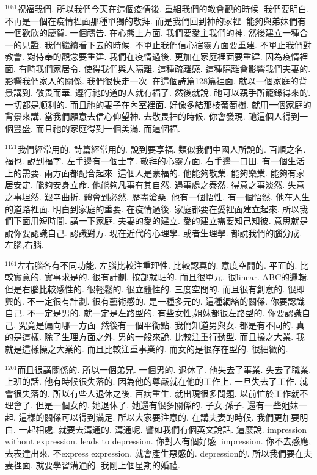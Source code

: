 \documentclass{book}
\begin{document}
$^{1081}$祝福我們.
所以我們今天在這個疫情後.
重組我們的教會觀的時候.
我們要明白.
不再是一個在疫情裡面那種單獨的敬拜.
而是我們回到神的家裡.
能夠與弟妹們有一個歡欣的慶賀.
一個禱告.
在心態上方面.
我們要愛主我們的神.
然後建立一種合一的見證.
我們繼續看下去的時候.
不單止我們信心宿靈方面要重建.
不單止我們對教會.
對侍奉的觀念要重建.
我們在疫情過後.
更加在家庭裡面要重建.
因為疫情裡面.
有時我們家居令.
使得我們與人隔離.
這種疏離感.
這種隔離會影響我們夫妻的.
影響我們家人的關係.
我們很快走一次.
在這個詩篇128篇裡面.
就以一個家庭的背景講到.
敬畏而華.
遵行祂的道的人就有福了.
然後就說.
祂可以親手所籠錄得來的.
一切都是順利的.
而且祂的妻子在內室裡面.
好像多結那枝葡萄樹.
就用一個家庭的背景來講.
當我們願意去信心仰望神.
去敬畏神的時候.
你會發現.
祂這個人得到一個豐盛.
而且祂的家庭得到一個美滿.
而這個福.

$^{1121}$我們經常用的.
詩篇經常用的.
說到要享福.
類似我們中國人所說的.
百順之名.
福也.
說到福字.
左手邊有一個士字.
敬拜的心靈方面.
右手邊一口田.
有一個生活上的需要.
兩方面都配合起來.
這個人是蒙福的.
他能夠敬業.
能夠樂業.
能夠有家居安定.
能夠安身立命.
他能夠凡事有其自然.
遇事處之泰然.
得意之事淡然.
失意之事坦然.
艱辛曲折.
體會到必然.
歷盡滄桑.
他有一個悟性.
有一個悟然.
他在人生的道路裡面.
明白到家庭的重要.
在疫情過後.
家庭都要在愛裡面建立起來.
所以我們下面用短時間.
講一下家庭.
夫妻的愛的建立.
愛的建立需要知己知彼.
意思就是說你要認識自己.
認識對方.
現在近代的心理學.
或者生理學.
都說我們的腦分成.
左腦,右腦.

$^{1161}$左右腦各有不同功能.
左腦比較注重理性.
比較認真的.
意度空間的.
平面的.
比較實意的.
實事求是的.
很有計劃.
按部就班的.
而且很單元.
很linear.
ABC的邏輯.
但是右腦比較感性的.
很輕鬆的.
很立體性的.
三度空間的.
而且很有創意的.
很即興的.
不一定很有計劃.
很有藝術感的.
是一種多元的.
這種網絡的關係.
你要認識自己.
不一定是男的.
就一定是左路型的.
有些女性,姐妹都很左路型的.
你要認識自己.
究竟是偏向哪一方面.
然後有一個平衡點.
我們知道男與女.
都是有不同的.
真的是這樣.
除了生理方面之外.
男的一般來說.
比較注重行動型.
而且操之大業.
我就是這樣操之大業的.
而且比較注重事業的.
而女的是很存在型的.
很細緻的.

$^{1201}$而且很講關係的.
所以一個弟兄.
一個男的.
退休了.
他失去了事業.
失去了職業.
上班的話.
他有時候很失落的.
因為他的尊嚴就在他的工作上.
一旦失去了工作.
就會很失落的.
所以有些人退休之後.
百病重生.
就出現很多問題.
以前忙於工作就不理會了.
但是一個女的.
她退休了.
她還有很多關係的.
子女,孫子.
還有一些姐妹一起.
這樣的關係可以得到滿足.
所以大家要注意的.
在講夫妻的時候.
我們更加要明白.
一起相處.
就要去溝通的.
溝通呢.
譬如我們有個英文說話.
這麼說.
impression without expression.
leads to depression.
你對人有個好感.
impression.
你不去感應,去表達出來.
不express expression.
就會產生惡感的.
depression的.
所以我們要在夫妻裡面.
就要學習溝通的.
我剛上個星期的婚禮.
\end{document}
